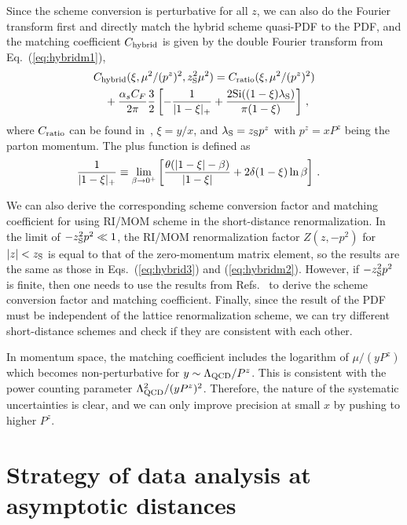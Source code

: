 \documentclass[preprint,12pt]{elsarticle}
\newcommand{\nn}{\nonumber}
\DeclareRobustCommand{\eq}[1]{Eq.~(\ref{eq:#1})}
\DeclareRobustCommand{\eqs}[2]{Eqs.~(\ref{eq:#1}) and (\ref{eq:#2})}
\begin{document}
Since the scheme conversion is perturbative for all $z$, we can also do the Fourier transform first and directly match the hybrid scheme quasi-PDF to the PDF, and the matching coefficient $C_{\rm hybrid}$ is given by the double Fourier transform from \eq{hybridm1},
\begin{align}\label{eq:hybridm2}
&C_{\rm hybrid}(\xi, \mu^2/(p^z)^2, z_{\rm S}^2\mu^2) = C_{\rm ratio}(\xi, \mu^2/(p^z)^2) \nn\\
&\quad+{\alpha_sC_F\over 2\pi}{3\over 2} \left[-{1\over |1-\xi|_+}+ \frac{2 \text{Si}((1-\xi) \lambda_{\rm S})}{\pi  (1-\xi)} \right]\,,
\end{align}
where $C_{\rm ratio}$ can be found in~\cite{Izubuchi:2018srq}, $\xi=y/x$, and $\lambda_{\rm S}=z_{\rm S}p^z$ with $p^z=xP^z$ being the parton momentum. The plus function is defined as
\begin{align}
	{1\over |1-\xi|_+} &\equiv \lim_{\beta\to0^+}\left[ {\theta(|1-\xi|-\beta)\over |1-\xi|} + 2\delta(1-\xi)\ln\beta\right] \,.
\end{align}

We can also derive the corresponding scheme conversion factor and matching coefficient for using RI/MOM scheme in the short-distance renormalization. In the limit of $-z^2_{\rm S}p^2 \ll 1$, the RI/MOM renormalization factor $Z(z,-p^2)$ for $|z|<z_{\rm S}$ is equal to that of the zero-momentum matrix element, so the results are the same as those in \eqs{hybrid3}{hybridm2}. However, if $-z^2_{\rm S}p^2$ is finite, then one needs to use the results from Refs.~\cite{Constantinou:2017sej,Stewart:2017tvs} to derive the scheme conversion factor and matching coefficient. 
Finally, since the result of the PDF must be independent of the lattice renormalization scheme, we can try different short-distance schemes and check if they are consistent with each other.

In momentum space, the matching coefficient includes the logarithm of $\mu/(yP^z)$ which becomes non-perturbative for $y\sim \Lambda_{\rm QCD}/P^z$. This is consistent with the power counting parameter $\Lambda^2_{\rm QCD}/(yP^z)^2$. Therefore, the nature of the systematic uncertainties is clear, and we can only improve precision at
small $x$ by pushing to higher $P^z$.





\section{Strategy of data analysis at asymptotic distances}
\label{sec:regge}
\end{document}
